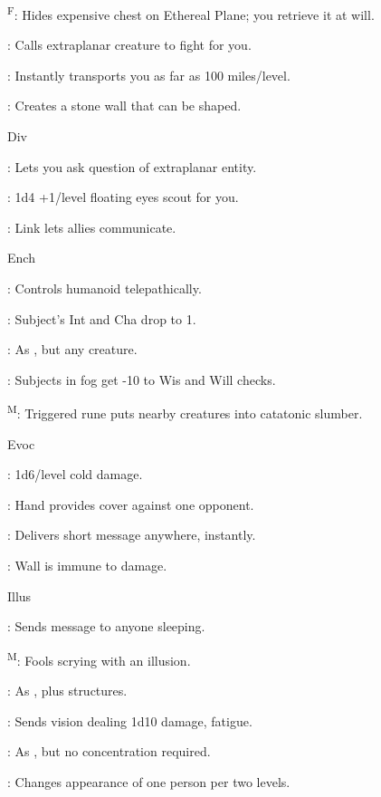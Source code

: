 \textsuperscript{F}: Hides expensive chest on Ethereal Plane; you retrieve it at will.

: Calls extraplanar creature to fight for you.

: Instantly transports you as far as 100 miles/level.

: Creates a stone wall that can be shaped.

Div

: Lets you ask question of extraplanar entity.

: 1d4 +1/level floating eyes scout for you.

: Link lets allies communicate.

Ench

: Controls humanoid telepathically.

: Subject's Int and Cha drop to 1.

: As , but any creature.

: Subjects in fog get -10 to Wis and Will checks.

\textsuperscript{M}: Triggered rune puts nearby creatures into catatonic slumber.

Evoc

: 1d6/level cold damage.

: Hand provides cover against one opponent.

: Delivers short message anywhere, instantly.

: Wall is immune to damage.

Illus

: Sends message to anyone sleeping.

\textsuperscript{M}: Fools scrying with an illusion.

: As , plus structures.

: Sends vision dealing 1d10 damage, fatigue.

: As , but no concentration required.

: Changes appearance of one person per two levels.

